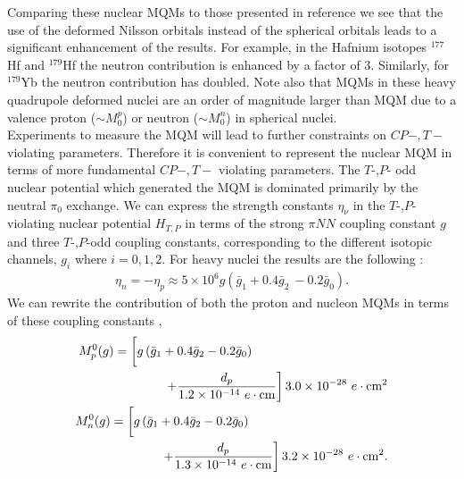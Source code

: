 \documentclass[10pt,a4paper, twoside, openright]{report}
\begin{document}
Comparing these nuclear MQMs to those presented in reference \cite{Flambaum2014} we see that the use of the deformed Nilsson orbitals instead of the spherical orbitals leads to a  significant enhancement of the results. For example, in the Hafnium isotopes $^{177}$Hf and  $^{179}$Hf the neutron contribution is enhanced by a factor of 3.  Similarly, for $^{179}$Yb the neutron contribution has doubled.  Note also that  MQMs in these heavy quadrupole deformed nuclei are an order of magnitude larger than MQM due to a valence proton   ($ \sim M_{0}^{p}$)  or neutron  ($\sim M_{0}^{n}$) in spherical nuclei.\\
\linebreak
Experiments to measure the MQM will lead to further constraints on $CP-,T-$ violating parameters. Therefore it is convenient to represent the nuclear MQM in terms of more fundamental $CP-,T-$ violating parameters. The $T$-,$P$- odd nuclear potential which generated the MQM is dominated primarily by the neutral $\pi_0$ exchange. We can express the strength constants $\eta_{\nu}$ in the  $T$-,$P$- violating nuclear potential $H_{T,P}$  in terms of the strong $\pi NN$ coupling constant $g$ and three $T$-,$P$-odd coupling constants, corresponding to the different isotopic  channels,  $g_i$ where $i=0,1,2$. For heavy nuclei the results are the following  \cite{Dmitriev1994, SFK1984}:
\begin{align}
\eta_{n} = -\eta_{p} \approx 5\times 10^{6}g\left(\bar{g}_1 + 0.4 \bar{g}_2\ - 0.2\bar{g}_0\right) .
\end{align}
We can rewrite the contribution of both the proton and nucleon MQMs in terms of these coupling constants \cite{Flambaum1994, Vorov1995},
\begin{align} 
\begin{split}
M_{p}^0(g) &= \left[ \vphantom{\dfrac{1}{2}} g\left(\bar{g}_1 + 0.4\bar{g}_2 - 0.2\bar{g}_0\right) \right. \\
&\qquad \qquad \left. + \dfrac{d_{p}}{1.2 \times 10^{-14} \ e\cdot\text{cm}}\right]3.0 \times 10^{-28} \ e\cdot\text{cm}^2 
\end{split}\label{eq:MQM_pion_p} \\
\begin{split}
M_{n}^0(g) &= \left[ \vphantom{\dfrac{1}{2}} g\left(\bar{g}_1 + 0.4\bar{g}_2 - 0.2\bar{g}_0\right) \right. \\
& \qquad \qquad  \left. + \dfrac{d_{p}}{1.3 \times 10^{-14} \ e\cdot\text{cm}}\right]3.2 \times 10^{-28} \ e\cdot\text{cm}^2. 
\end{split} \label{eq:MQM_pion_n}
\end{align}
\end{document}
